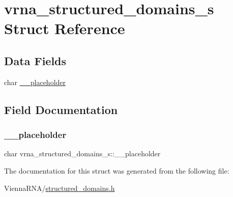 \hypertarget{structvrna__structured__domains__s}{}\section{vrna\+\_\+structured\+\_\+domains\+\_\+s Struct Reference}
\label{structvrna__structured__domains__s}
\subsection*{Data Fields}
\begin{DoxyCompactItemize}
\item 
char \mbox{\hyperlink{structvrna__structured__domains__s_acba7ee206068db17beb69ac438935aeb}{\+\_\+\+\_\+placeholder}}
\end{DoxyCompactItemize}


\subsection{Field Documentation}
\mbox{\label{structvrna__structured__domains__s_acba7ee206068db17beb69ac438935aeb}} 
\subsubsection{\texorpdfstring{\+\_\+\+\_\+placeholder}{\_\_placeholder}}
{\footnotesize\ttfamily char vrna\+\_\+structured\+\_\+domains\+\_\+s\+::\+\_\+\+\_\+placeholder}



The documentation for this struct was generated from the following file\+:\begin{DoxyCompactItemize}
\item 
Vienna\+R\+N\+A/\mbox{\hyperlink{structured__domains_8h}{structured\+\_\+domains.\+h}}\end{DoxyCompactItemize}
